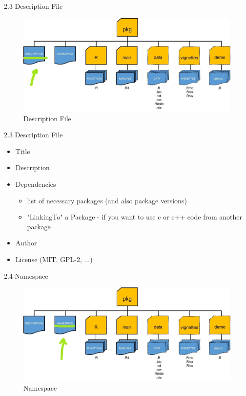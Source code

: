 \documentclass[11pt,a4paper]{beamer}
\begin{document}
\begin{frame}[t]{2.3 Description File}
	
	
	\begin{figure}
		\centering
		\includegraphics[width=0.9\linewidth]{Desc}
		\caption{Description File}
		\label{fig:packages}
	\end{figure}
	
	
\end{frame}

\begin{frame}[t]{2.3 Description File}
	
	\begin{itemize}
		\item Title	
		\item Description
		\item Dependencies
		\begin{itemize}
			\item  list of necessary packages (and also package versions)
			\item "LinkingTo" a Package - if you want to use c or c++ code from another package
		\end{itemize}
		\item Author	
		\item License (MIT, GPL-2, ...)
		
	\end{itemize}
	
\end{frame}




\begin{frame}[t]{2.4 Namespace}
	
	
	\begin{figure}
		\centering
		\includegraphics[width=0.9\linewidth]{Names}
		\caption{Namespace}
		\label{fig:packages}
	\end{figure}
	
	
\end{frame}
\end{document}
